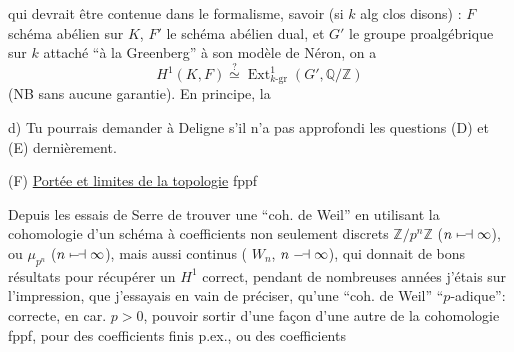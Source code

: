qui devrait être contenue dans le formalisme, savoir (si $k$ alg clos disons) :  $F$ schéma abélien sur $K$, $F'$ le schéma abélien dual, et $G'$ le groupe proalgébrique sur $k$ attaché ``à la Greenberg'' à son modèle de Néron, on a
\[
 H^1(K,F)\overset{?}{\simeq}\operatorname{Ext}^{1}_{k\text{-}\mathrm{gr}}(G',\mathbb Q/\mathbb Z)
\]
(NB sans aucune garantie). En principe, la
{\reversemarginpar{}}

d) Tu pourrais demander à Deligne s'il n'a pas approfondi les questions (D) et (E) dernièrement.


(F) \uline{Portée et limites de la topologie} fppf

Depuis les essais de Serre de trouver une ``coh. de Weil'' en utilisant la cohomologie d'un schéma à coefficients non seulement discrets $\mathbb Z/p^n\mathbb Z$ ($n\mathrel{\mapstochar\relbar\joinrel\dashv}\infty$), ou $\mu_{p^n}$ ($n\mathrel{\mapstochar\relbar\joinrel\dashv}\infty$), mais aussi continus ( $W_n$, $n\mathrel{\relbar\joinrel\dashv}\infty$), qui donnait de bons résultats pour récupérer un $H^1$ correct, pendant de nombreuses années j'étais  sur l'impression, que j'essayais en vain de préciser, qu'une ``coh. de Weil'' ``$p$-adique'': correcte, en car. $p>0$,  pouvoir sortir d'une façon  d'une autre de la cohomologie fppf, pour des coefficients finis p.ex., ou des coefficients
